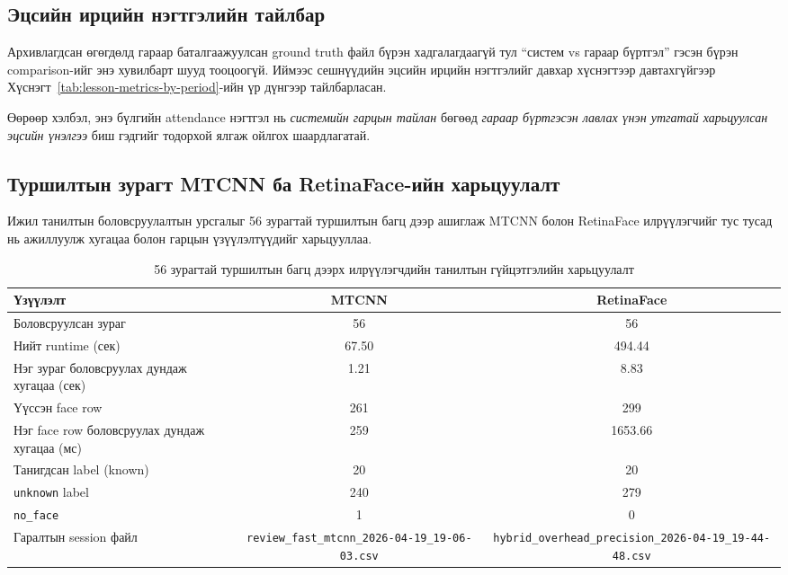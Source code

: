 
\subsection{Эцсийн ирцийн нэгтгэлийн тайлбар}
Архивлагдсан өгөгдөлд гараар баталгаажуулсан ground truth файл бүрэн хадгалагдаагүй тул ``систем vs гараар бүртгэл'' гэсэн бүрэн comparison-ийг энэ хувилбарт шууд тооцоогүй. Иймээс сешнүүдийн эцсийн ирцийн нэгтгэлийг давхар хүснэгтээр давтахгүйгээр Хүснэгт~\ref{tab:lesson-metrics-by-period}-ийн үр дүнгээр тайлбарласан.

Өөрөөр хэлбэл, энэ бүлгийн attendance нэгтгэл нь \textit{системийн гарцын тайлан} бөгөөд \textit{гараар бүртгэсэн лавлах үнэн утгатай харьцуулсан эцсийн үнэлгээ} биш гэдгийг тодорхой ялгаж ойлгох шаардлагатай.

\subsection{Туршилтын зурагт MTCNN ба RetinaFace-ийн харьцуулалт}
Ижил танилтын боловсруулалтын урсгалыг 56 зурагтай туршилтын багц дээр ашиглаж MTCNN болон RetinaFace илрүүлэгчийг тус тусад нь ажиллуулж хугацаа болон гарцын үзүүлэлтүүдийг харьцууллаа.

\begin{table}[H]
	\centering
	\caption{56 зурагтай туршилтын багц дээрх илрүүлэгчдийн танилтын гүйцэтгэлийн харьцуулалт}
	\label{tab:flat-detector-runtime-comparison}
	\begin{tabular}{|l|c|c|}
		\hline
		\textbf{Үзүүлэлт} & \textbf{MTCNN} & \textbf{RetinaFace} \\
		\hline
		Боловсруулсан зураг & 56 & 56 \\
		\hline
		Нийт runtime (сек) & 67.50 & 494.44 \\
		\hline
		Нэг зураг боловсруулах дундаж хугацаа (сек) & 1.21 & 8.83 \\
		\hline
		Үүссэн face row & 261 & 299 \\
		\hline
		Нэг face row боловсруулах дундаж хугацаа (мс) & 259 & 1653.66 \\
		\hline
		Танигдсан label (known) & 20 & 20 \\
		\hline
		\texttt{unknown} label & 240 & 279 \\
		\hline
		\texttt{no\_face} & 1 & 0 \\
		\hline
		Гаралтын session файл & \texttt{review\_fast\_mtcnn\_2026-04-19\_19-06-03.csv} & \texttt{hybrid\_overhead\_precision\_2026-04-19\_19-44-48.csv} \\
		\hline
	\end{tabular}
\end{table}

